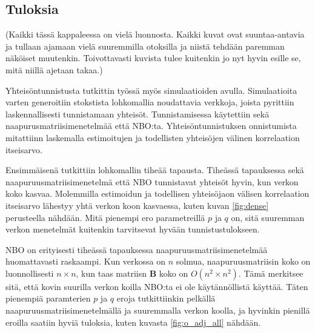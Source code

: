 \documentclass[finnish,12pt,a4paper,pdftex,sci,utf8]{aaltothesis}
\begin{document}
\subsection{Tuloksia}
(Kaikki tässä kappaleessa on vielä luonnosta. Kaikki kuvat ovat suuntaa-antavia ja tullaan ajamaan vielä suuremmilla otoksilla ja niistä tehdään paremman näköiset muutenkin. Toivottavasti kuvista tulee kuitenkin jo nyt hyvin esille se, mitä niillä ajetaan takaa.)

Yhteisöntunnistusta tutkittin työssä myös simulaatioiden avulla. Simulaatioita varten generoitiin stokstista lohkomallia noudattavia verkkoja, joista pyrittiin laskennallisesti tunnistamaan yhteisöt. Tunnistamisessa käytettiin sekä naapurusmatriisimenetelmää että NBO:ta. Yhteisöntunnistuksen onnistumista mitattiinn laskemalla estimoitujen ja todellisten yhteisöjen välinen korrelaation itseisarvo.

Ensimmäisenä tutkittiin lohkomallin tiheää tapausta. Tiheässä tapauksessa sekä naapuruusmatriisimenetelmä että NBO tunnistavat yhteisöt hyvin, kun verkon koko kasvaa. Molemmilla estimoidun ja todellisen yhteisöjaon välisen korrelaation itseisarvo lähestyy yhtä verkon koon kasvaessa, kuten kuvan \ref{fig:dense} perusteella nähdään. Mitä pienempi ero parametreillä $p$ ja $q$ on, sitä suuremman verkon menetelmät kuitenkin tarvitsevat hyvään tunnistustulokseen.

NBO on erityisesti tiheässä tapauksessa naapuruusmatriisimenetelmää huomattavasti raskaampi. Kun verkossa on $n$ solmua, naapuruusmatriisin koko on luonnollisesti $n \times n$, kun taas matriisn $\mathbf{B}$ koko on $O(n^2 \times n^2)$. Tämä merkitsee sitä, että kovin suurilla verkon koilla NBO:ta ei ole käytännöllistä käyttää. Täten pienempiä paramterien $p$ ja $q$ eroja tutkittiinkin pelkällä naapuruusmatriisimenetelmällä ja suuremmalla verkon koolla, ja hyvinkin pienillä eroilla saatiin hyviä tuloksia, kuten kuvasta \ref{fig:o_adj_all} nähdään.
\end{document}
